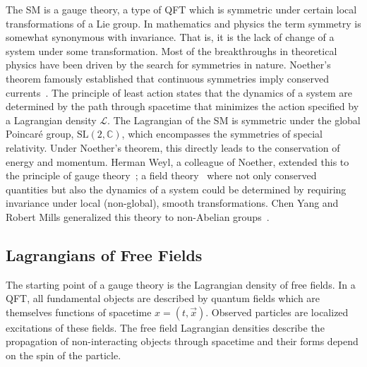 The \Gls{SM} is a gauge theory, a type of \Gls{QFT} which is symmetric under certain local transformations of a Lie group.
In mathematics and physics the term symmetry is somewhat synonymous with invariance.
That is, it is the lack of change of a system under some transformation.
Most of the breakthroughs in theoretical physics have been driven by the search for symmetries in nature.
Noether's theorem famously established that continuous symmetries imply conserved currents~\cite{Noether1918}.
The principle of least action states that the dynamics of a system are determined by the path through spacetime that minimizes the action specified by a Lagrangian density $\mathcal{L}$.
The Lagrangian of the \Gls{SM} is symmetric under the global Poincaré group, $\text{SL}(2, \mathbb{C})$, which encompasses the symmetries of special relativity.
Under Noether's theorem, this directly leads to the conservation of energy and momentum.
Herman Weyl, a colleague of Noether, extended this to the principle of gauge theory~\cite{GaugeSym}; a field theory~\cite{Gordon1926} where not only conserved quantities but also the dynamics of a system could be determined by requiring invariance under local (non-global), smooth transformations.
Chen Yang and Robert Mills generalized this theory to non-Abelian groups~\cite{YangMills}.

\subsection{Lagrangians of Free Fields}

The starting point of a gauge theory is the Lagrangian density of free fields.
In a \Gls{QFT}, all fundamental objects are described by quantum fields which are themselves functions of spacetime $x = (t, \vec{x})$.
Observed particles are localized excitations of these fields.
The free field Lagrangian densities describe the propagation of non-interacting objects through spacetime and their forms depend on the spin of the particle.

